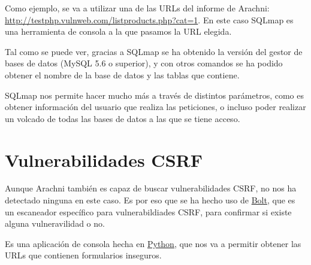 \documentclass{\ClassPath/viu-tfm-template}
\begin{document}
Como ejemplo, se va a utilizar una de las URLs del informe de Arachni: \href{http://testphp.vulnweb.com/listproducts.php?cat=1}{http://testphp.vulnweb.com/listproducts.php?cat=1}. En este caso SQLmap es una herramienta de consola a la que pasamos la URL elegida.


Tal como se puede ver, gracias a SQLmap se ha obtenido la versión del gestor de bases de datos (MySQL 5.6 o superior), y con otros comandos se ha podido obtener el nombre de la base de datos y las tablas que contiene.

SQLmap nos permite hacer mucho más a través de distintos parámetros, como es obtener información del usuario que realiza las peticiones, o incluso poder realizar un volcado de todas las bases de datos a las que se tiene acceso.


\chapter{Vulnerabilidades CSRF}
Aunque Arachni también es capaz de buscar vulnerabilidades CSRF, no nos ha detectado ninguna en este caso. Es por eso que se ha hecho uso de \href{https://github.com/s0md3v/Bolt}{Bolt}, que es un escaneador específico para vulnerabildiades CSRF, para confirmar si existe alguna vulneravilidad o no.

Es una aplicación de consola hecha en \href{https://www.python.org/}{Python}, que nos va a permitir obtener las URLs que contienen formularios inseguros.
\end{document}
